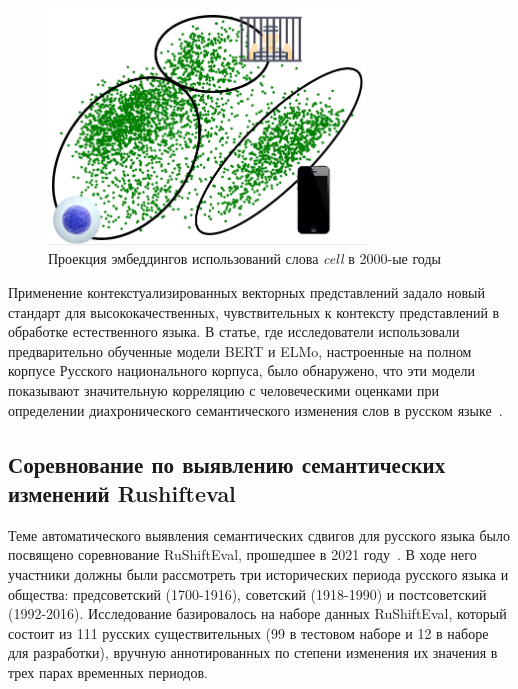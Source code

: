 \documentclass[LI,VKR]{HSEUniversity}
\begin{document}
\begin{figure}[H]
	\centering
	\includegraphics[width=0.75\textwidth]{img/theory/cell_projection_2000_photoshop}
	\caption{Проекция эмбеддингов использований слова \textit{cell} в 2000-ые годы}
	\label{fig:Контекстуальные вложения}
\end{figure}

Применение контекстуализированных векторных представлений задало новый стандарт для
высококачественных, чувствительных к контексту представлений в обработке естественного языка.
В статье, где исследователи использовали предварительно обученные модели BERT и ELMo,
настроенные на полном корпусе Русского национального корпуса, было обнаружено,
что эти модели показывают значительную корреляцию с человеческими оценками
при определении диахронического семантического изменения слов в русском языке~\cite{rodina2020elmo}.

\subsection{Соревнование по выявлению семантических изменений Rushifteval}

Теме автоматического выявления семантических сдвигов для русского языка
было посвящено соревнование RuShiftEval, прошедшее в 2021 году~\cite{rushifteval}.
В ходе него участники должны были рассмотреть три исторических периода русского языка и общества:
предсоветский (1700-1916), советский (1918-1990) и постсоветский (1992-2016).
Исследование базировалось на наборе данных RuShiftEval, который состоит из
111 русских существительных (99 в тестовом наборе и 12 в наборе для разработки),
вручную аннотированных по степени изменения их значения в трех парах временных периодов.
\end{document}
